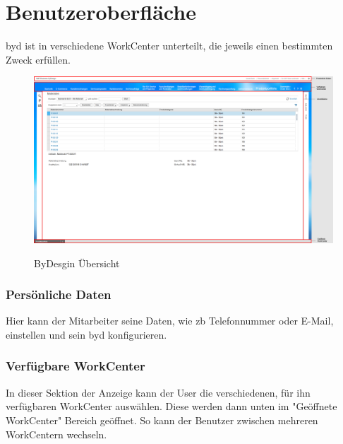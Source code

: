 \section{Benutzeroberfläche}

\gls{byd} ist in verschiedene WorkCenter unterteilt, die jeweils einen bestimmten Zweck erfüllen.

\begin{figure}[H]
	\begin{center}
	\includegraphics[width=1.0\textwidth]{grafiken/ByDesign-Ubersicht.png}
	\caption{ByDesgin Übersicht}
	\vspace{-10pt}
	\label{abb:byd-overview}
	\end{center}
\end{figure}

\subsubsection{Persönliche Daten}

Hier kann der Mitarbeiter seine Daten, wie \gls{zb} Telefonnummer oder E-Mail, einstellen und sein \gls{byd} konfigurieren.

\subsubsection{Verfügbare WorkCenter}

In dieser Sektion der Anzeige kann der User die verschiedenen, für ihn verfügbaren WorkCenter auswählen. Diese werden dann unten im "Geöffnete WorkCenter" Bereich geöffnet. So kann der Benutzer zwischen mehreren WorkCentern wechseln.

